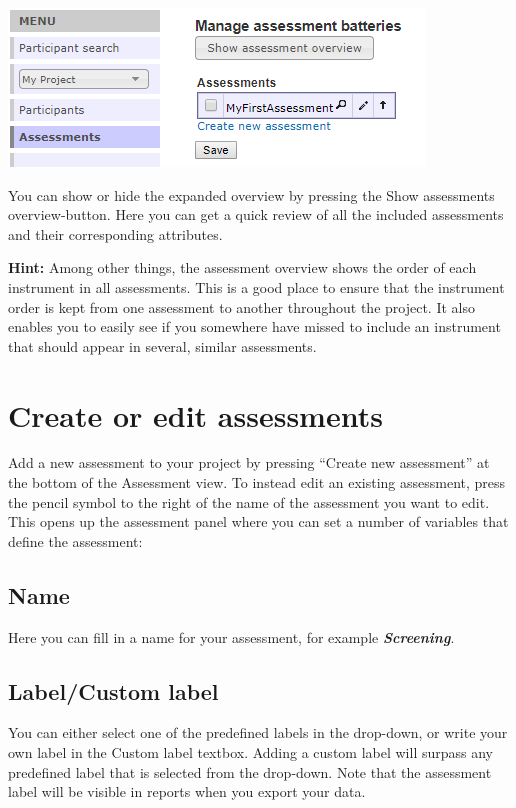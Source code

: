 \documentclass[]{book}
\begin{document}
\includegraphics{images/assessement.png}

You can show or hide the expanded overview by pressing the Show assessments overview-button. Here you can get a quick review of all the included assessments and their corresponding attributes.

\textbf{Hint:} Among other things, the assessment overview shows the order of each instrument in all assessments. This is a good place to ensure that the instrument order is kept from one assessment to another throughout the project. It also enables you to easily see if you somewhere have missed to include an instrument that should appear in several, similar assessments.

\hypertarget{create-or-edit-assessments}{%
\section{Create or edit assessments}\label{create-or-edit-assessments}}

Add a new assessment to your project by pressing ``Create new assessment'' at the bottom of the Assessment view. To instead edit an existing assessment, press the pencil symbol to the right of the name of the assessment you want to edit. This opens up the assessment panel where you can set a number of variables that define the assessment:

\hypertarget{name}{%
\subsection{Name}\label{name}}

Here you can fill in a name for your assessment, for example \textbf{\emph{Screening}}.

\hypertarget{labelcustom-label}{%
\subsection{Label/Custom label}\label{labelcustom-label}}

You can either select one of the predefined labels in the drop-down, or write your own label in the Custom label textbox. Adding a custom label will surpass any predefined label that is selected from the drop-down. Note that the assessment label will be visible in reports when you export your data.
\end{document}
